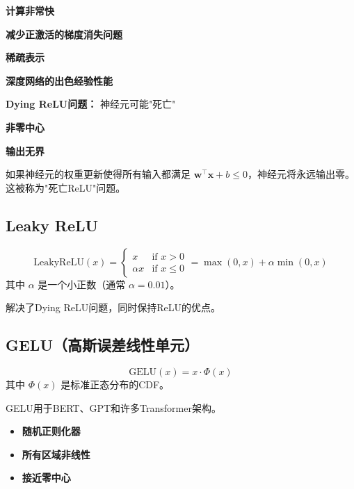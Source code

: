 \begin{advantages}
    \item \textbf{计算非常快}
    \item \textbf{减少正激活的梯度消失问题}
    \item \textbf{稀疏表示}
    \item \textbf{深度网络的出色经验性能}
\end{advantages}

\begin{disadvantages}
    \item \textbf{Dying ReLU问题：} 神经元可能"死亡"
    \item \textbf{非零中心}
    \item \textbf{输出无界}
\end{disadvantages}

\begin{note}
如果神经元的权重更新使得所有输入都满足 $\mathbf{w}^\top \mathbf{x} + b \leq 0$，神经元将永远输出零。这被称为"死亡ReLU"问题。
\end{note}

\subsection{Leaky ReLU}

\begin{equation}
\text{LeakyReLU}(x) = 
\begin{cases}
x & \text{if } x > 0 \\
\alpha x & \text{if } x \leq 0
\end{cases}
= \max(0, x) + \alpha \min(0, x)
\end{equation}
其中 $\alpha$ 是一个小正数（通常 $\alpha = 0.01$）。

解决了Dying ReLU问题，同时保持ReLU的优点。

\subsection{GELU（高斯误差线性单元）}

\begin{equation}
\text{GELU}(x) = x \cdot \Phi(x)
\end{equation}
其中 $\Phi(x)$ 是标准正态分布的CDF。

GELU用于BERT、GPT和许多Transformer架构。

\begin{properties}[GELU属性]
\begin{itemize}
    \item \textbf{随机正则化器}
    \item \textbf{所有区域非线性}
    \item \textbf{接近零中心}
\end{itemize}
\end{properties}

